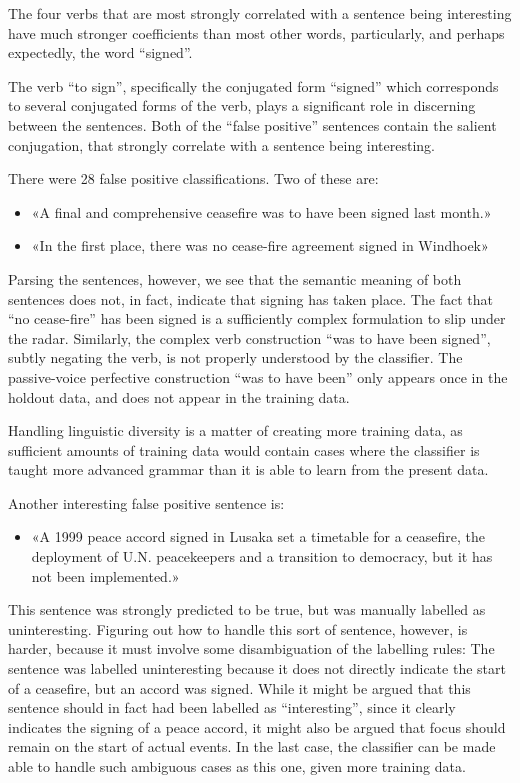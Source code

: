 \documentclass[12pt,twoside]{reedthesis}
\providecommand{\tightlist}{%
  \setlength{\itemsep}{0pt}\setlength{\parskip}{0pt}}
\begin{document}
\noindent
The four verbs that are most strongly correlated with a sentence being
interesting have much stronger coefficients than most other words,
particularly, and perhaps expectedly, the word ``signed''.

The verb ``to sign'', specifically the conjugated form ``signed'' which
corresponds to several conjugated forms of the verb, plays a significant
role in discerning between the sentences. Both of the ``false positive''
sentences contain the salient conjugation, that strongly correlate with
a sentence being interesting.

There were 28 false positive classifications. Two of these are:
\begin{itemize}
\tightlist
\item
  «A final and comprehensive ceasefire was to have been signed last
  month.»
\item
  «In the first place, there was no cease-fire agreement signed in
  Windhoek»
\end{itemize}
Parsing the sentences, however, we see that the semantic meaning of both
sentences does not, in fact, indicate that signing has taken place. The
fact that ``no cease-fire'' has been signed is a sufficiently complex
formulation to slip under the radar. Similarly, the complex verb
construction ``was to have been signed'', subtly negating the verb, is
not properly understood by the classifier. The passive-voice perfective
construction ``was to have been'' only appears once in the holdout data,
and does not appear in the training data.

Handling linguistic diversity is a matter of creating more training
data, as sufficient amounts of training data would contain cases where
the classifier is taught more advanced grammar than it is able to learn
from the present data.

Another interesting false positive sentence is:
\begin{itemize}
\tightlist
\item
  «A 1999 peace accord signed in Lusaka set a timetable for a ceasefire,
  the deployment of U.N. peacekeepers and a transition to democracy, but
  it has not been implemented.»
\end{itemize}
This sentence was strongly predicted to be true, but was manually
labelled as uninteresting. Figuring out how to handle this sort of
sentence, however, is harder, because it must involve some
disambiguation of the labelling rules: The sentence was labelled
uninteresting because it does not directly indicate the start of a
ceasefire, but an accord was signed. While it might be argued that this
sentence should in fact had been labelled as ``interesting'', since it
clearly indicates the signing of a peace accord, it might also be argued
that focus should remain on the start of actual events. In the last
case, the classifier can be made able to handle such ambiguous cases as
this one, given more training data.
\end{document}
